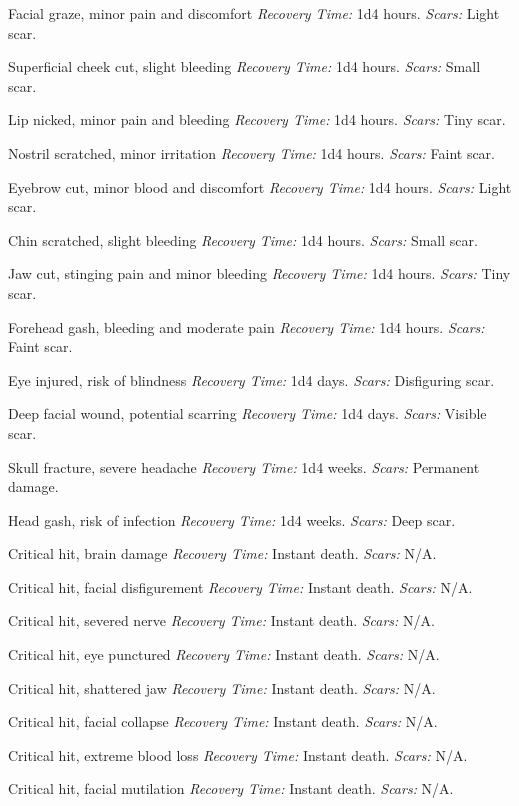 \documentclass[12pt]{book}  %
\begin{document}
\begin{description}[labelwidth=1.5em, leftmargin=*, itemsep=0.4em]
    \item[1 -] Facial graze, minor pain and discomfort \textit{Recovery Time:} 1d4 hours. \textit{Scars:} Light scar.
    \item[2 -] Superficial cheek cut, slight bleeding \textit{Recovery Time:} 1d4 hours. \textit{Scars:} Small scar.
    \item[3 -] Lip nicked, minor pain and bleeding \textit{Recovery Time:} 1d4 hours. \textit{Scars:} Tiny scar.
    \item[4 -] Nostril scratched, minor irritation \textit{Recovery Time:} 1d4 hours. \textit{Scars:} Faint scar.
    \item[5 -] Eyebrow cut, minor blood and discomfort \textit{Recovery Time:} 1d4 hours. \textit{Scars:} Light scar.
    \item[6 -] Chin scratched, slight bleeding \textit{Recovery Time:} 1d4 hours. \textit{Scars:} Small scar.
    \item[7 -] Jaw cut, stinging pain and minor bleeding \textit{Recovery Time:} 1d4 hours. \textit{Scars:} Tiny scar.
    \item[8 -] Forehead gash, bleeding and moderate pain \textit{Recovery Time:} 1d4 hours. \textit{Scars:} Faint scar.
    \item[9 -] Eye injured, risk of blindness \textit{Recovery Time:} 1d4 days. \textit{Scars:} Disfiguring scar.
    \item[10 -] Deep facial wound, potential scarring \textit{Recovery Time:} 1d4 days. \textit{Scars:} Visible scar.
    \item[11 -] Skull fracture, severe headache \textit{Recovery Time:} 1d4 weeks. \textit{Scars:} Permanent damage.
    \item[12 -] Head gash, risk of infection \textit{Recovery Time:} 1d4 weeks. \textit{Scars:} Deep scar.
    \item[13 -] Critical hit, brain damage \textit{Recovery Time:} Instant death. \textit{Scars:} N/A.
    \item[14 -] Critical hit, facial disfigurement \textit{Recovery Time:} Instant death. \textit{Scars:} N/A.
    \item[15 -] Critical hit, severed nerve \textit{Recovery Time:} Instant death. \textit{Scars:} N/A.
    \item[16 -] Critical hit, eye punctured \textit{Recovery Time:} Instant death. \textit{Scars:} N/A.
    \item[17 -] Critical hit, shattered jaw \textit{Recovery Time:} Instant death. \textit{Scars:} N/A.
    \item[18 -] Critical hit, facial collapse \textit{Recovery Time:} Instant death. \textit{Scars:} N/A.
    \item[19 -] Critical hit, extreme blood loss \textit{Recovery Time:} Instant death. \textit{Scars:} N/A.
    \item[20 -] Critical hit, facial mutilation \textit{Recovery Time:} Instant death. \textit{Scars:} N/A.
\end{description}
\end{document}
